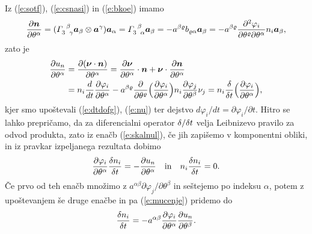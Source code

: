 Iz (\ref{e:sotf}), (\ref{e:csnasi}) in (\ref{e:bkoe}) imamo
\begin{equation*}
	\frac{\partial\vek{n}}{\partial\theta^{\alpha}}=
	(\cs{3}{\beta}{\gamma}\vek{a}_{\beta}\otimes\vek{a}^{\gamma})\vek{a}_{\alpha}=
	\cs{3}{\beta}{\alpha}\vek{a}_{\beta}
	=-a^{\beta\varrho}b_{\varrho\alpha}\vek{a}_{\beta}=
	-a^{\beta\varrho}\frac{\partial^2\varphi_i}{\partial\theta^{\varrho}\partial\theta^{\alpha}}
	n_i\vek{a}_{\beta},
\end{equation*}
zato je
\begin{align*}
	\frac{\partial u_n}{\partial\theta^{\alpha}}&=\frac{\partial(\boldsymbol \nu\cdot\boldsymbol n)}{\partial\theta^{\alpha}}=
	\frac{\partial\boldsymbol \nu}{\partial\theta^{\alpha}}\cdot\boldsymbol n+
	\boldsymbol \nu\cdot\frac{\partial\boldsymbol n}{\partial\theta^{\alpha}}\\
	&=n_i\frac{d}{dt}\frac{\partial\varphi_i}{\partial\theta^{\alpha}}-
	a^{\beta\varrho}\frac{\partial}{\partial\theta^{\varrho}}\Big(\frac{\partial\varphi_i}{\partial\theta^{\alpha}}\Big)
	n_i\frac{\partial\varphi_j}{\partial\theta^{\beta}}\nu_j=
	n_i\frac{\delta}{\delta t}\Big(\frac{\partial\varphi_i}{\partial\theta^{\alpha}}\Big),
\end{align*}
kjer smo upoštevali (\ref{e:dtdofg}), (\ref{e:nu}) ter dejstvo $d\varphi_i/dt=\partial\varphi_i/\partial t$.
Hitro se lahko prepričamo, da za diferencialni operator $\delta/\delta t$ velja Leibnizevo pravilo
za odvod produkta, zato iz enačb (\ref{e:skalnul}), če jih zapišemo v komponentni obliki,
in iz pravkar izpeljanega rezultata dobimo
\[
	\frac{\partial\varphi_i}{\partial\theta^{\alpha}}\frac{\delta n_i}{\delta t}=
	-\frac{\partial u_n}{\partial\theta^{\alpha}}\quad\mathrm{in}\quad
	n_i\frac{\delta n_i}{\delta t}=0.
\]
Če prvo od teh enačb množimo z $a^{\alpha\beta}\partial\varphi_j/\partial\theta^{\beta}$
in seštejemo po indeksu $\alpha$, potem z upoštevanjem še druge enačbe in pa (\ref{e:mucenje})
pridemo do
\begin{equation} \label{e:dtdni}
	\frac{\delta n_i}{\delta t}=-a^{\alpha\beta}\frac{\partial\varphi_i}{\partial\theta^{\alpha}}
	\frac{\partial u_n}{\partial\theta^{\beta}}.
\end{equation}

